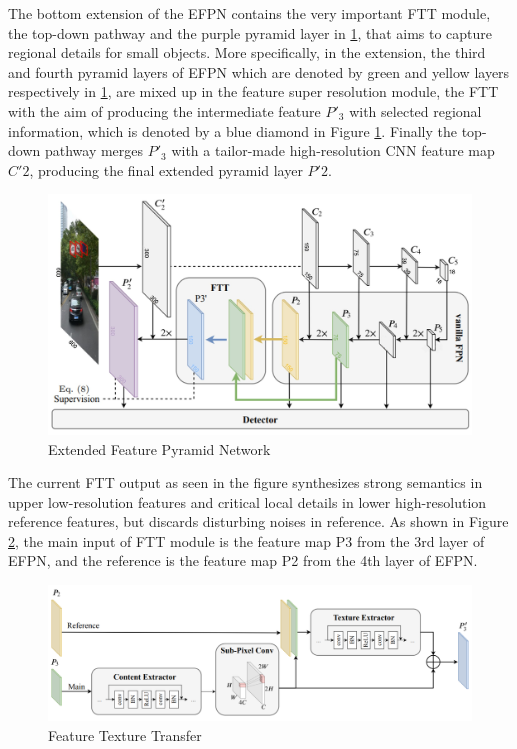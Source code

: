 The bottom extension of the EFPN  contains the very important FTT module, the top-down pathway and the purple pyramid layer in \ref{fig:efpn}, that aims to 
capture regional details for small objects. More specifically, in the extension, the third and fourth pyramid layers of EFPN which are denoted by green 
and yellow layers respectively in \ref{fig:efpn}, are mixed up in the feature super resolution module, the FTT with the aim of producing the intermediate 
feature $P'_{3}$ with selected regional information, which is denoted by a blue diamond in Figure \ref{fig:efpn}. Finally the top-down pathway merges $P'_{3}$ 
with a tailor-made high-resolution CNN feature map $C'2$, producing the final extended pyramid layer $P'2$.


\begin{figure}[h!]
    \centering
    \includegraphics[scale=0.15]{Figures/efpn.jpg}
    \caption{Extended Feature Pyramid Network}
    \label{fig:efpn}
\end{figure}

The current FTT output as seen in the figure  synthesizes strong semantics in upper low-resolution features and critical local details in lower high-resolution 
reference features, but discards disturbing noises in reference. As shown in Figure \ref{fig:ftt}, the main input of FTT module is the feature map P3
from the 3rd layer of EFPN, and the reference is the feature map P2 from the 4th layer of EFPN. 

\begin{figure}
    \centering
    \includegraphics[scale=0.18]{Figures/fft.png}
    \caption{Feature Texture Transfer}
    \label{fig:ftt}
\end{figure}

